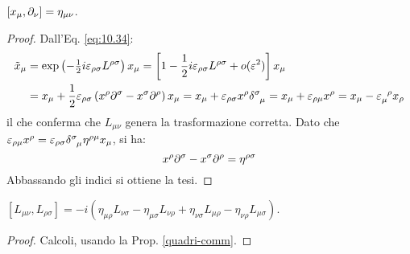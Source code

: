 \begin{proposition}\label{quadri-comm}
	$ [x_{\mu},\partial_{\nu}] = \eta_{\mu \nu} $.
\end{proposition}
\begin{proof} Dall'Eq. \ref{eq:10.34}:
	\begin{equation*}
		\begin{split}
			\tilde{x}_{\mu}
			&= \exp \left( -\tfrac{1}{2} i \varepsilon_{\rho \sigma} L^{\rho \sigma} \right) x_{\mu} = \left[ 1 - \frac{1}{2} i \varepsilon_{\rho \sigma} L^{\rho \sigma} + o(\varepsilon^2) \right] x_{\mu}\\
			&= x_{\mu} + \frac{1}{2} \varepsilon_{\rho \sigma} \left( x^{\rho} \pa^{\sigma} - x^{\sigma} \pa^{\rho} \right) x_{\mu} = x_{\mu} + \varepsilon_{\rho \sigma} x^{\rho} \tensor{\delta}{^\sigma _\mu} = x_{\mu} + \varepsilon_{\rho \mu} x^{\rho} = x_{\mu} - \tensor{\varepsilon}{_\mu^\rho} x_{\rho}
		\end{split}
	\end{equation*}
	il che conferma che $ L_{\mu \nu} $ genera la trasformazione corretta. Dato che $ \varepsilon_{\rho \mu} x^{\rho} = \varepsilon_{\rho \sigma} \tensor{\delta}{^\sigma_\mu} \eta^{\rho \mu} x_{\mu} $, si ha:
	\begin{equation*}
		x^{\rho} \partial^{\sigma} - x^{\sigma} \partial^{\rho} = \eta^{\rho \sigma}
	\end{equation*}
	Abbassando gli indici si ottiene la tesi.
\end{proof}

\begin{proposition}\label{lor-comm-1}
	$ [L_{\mu \nu},L_{\rho \sigma}] = -i \left( \eta_{\mu \rho} L_{\nu \sigma} - \eta_{\mu \sigma} L_{\nu \rho} + \eta_{\nu \sigma} L_{\mu \rho} - \eta_{\nu \rho} L_{\mu \sigma} \right) $.
\end{proposition}
\begin{proof}
	Calcoli, usando la Prop. \ref{quadri-comm}.
\end{proof}

